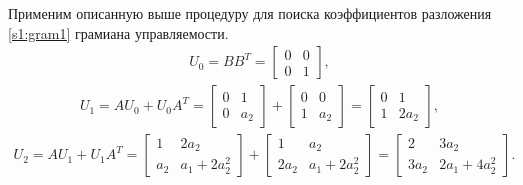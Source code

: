 \documentclass[../main.tex]{subfiles}
\begin{document}
Применим описанную выше процедуру для поиска коэффициентов разложения \eqref{s1:gram1} грамиана управляемости.
\begin{gather*}
     U_0 = B B^T =  \left[ {\begin{array}{*{20}{c}}
             0&0\\
             0&1
     \end{array}}\right],
\end{gather*}
\begin{gather*}
     U_1 = A U_0 + U_0 A^T = \left[ {\begin{array}{*{20}{c}}
             0&1\\
             0&a_2
     \end{array}}\right] + \left[ {\begin{array}{*{20}{c}}
             0&0\\
             1&a_2
     \end{array}}\right] = \left[ {\begin{array}{*{20}{c}}
             0&1\\
             1&2 a_2
     \end{array}}\right],
\end{gather*}
\begin{gather*}
     U_2 = A U_1 + U_1 A^T = \left[ {\begin{array}{*{20}{c}}
             1&2a_2\\
             a_2&a_1+2a_2^2
     \end{array}}\right] + \left[ {\begin{array}{*{20}{c}}
             1&a_2\\
             2a_2&a_1+2a_2^2
     \end{array}}\right] = \left[ {\begin{array}{*{20}{c}}
             2&3a_2\\
             3a_2&2a_1+4a_2^2
     \end{array}}\right].
\end{gather*}
 
\end{document}

